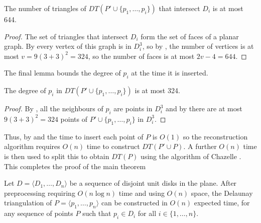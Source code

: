 \documentclass[lotsofwhite]{patmorin}
\begin{document}
\begin{lem}
The number of triangles of $DT(P'\cup\{p_1,\ldots,p_i\})$ that
intersect $D_i$ is at most 644.
\end{lem}

\begin{proof}
The set of triangles that intersect $D_i$ form the set of faces of a
planar graph.  By  every vertex of this graph is in
$D_i^3$, so by , the number of vertices 
is at most $v=9(3+3)^2=324$, so the number of faces is at most
$2v-4=644$. 
\end{proof}

The final lemma bounds the degree of $p_i$ at the time it is inserted.

\begin{lem}
The degree of $p_i$ in $DT(P'\cup\{p_1,\ldots,p_i\})$ is at most 324.
\end{lem}

\begin{proof}
By , all the neighbours of $p_i$ are points in $D_i^3$
and by  there are at most $9(3+3)^2=324$ points
of $P'\cup\{p_1,\ldots,p_i\}$ in $D_i^3$.
\end{proof}

Thus, by  and  the time to insert
each point of $P$ is $O(1)$ so the reconstruction algorithm requires
$O(n)$ time to construct $DT(P'\cup P)$.  A further $O(n)$ time is
then used to split this to obtain $DT(P)$ using the algorithm of
Chazelle \etal.  This completes the proof of the main theorem

\begin{thm}
Let $D=\langle D_1,\ldots,D_n\rangle$ be a sequence of disjoint unit
disks in the plane.  After preprocessing requiring $O(n\log n)$ time
and using $O(n)$ space, the Delaunay triangulation of $P=\langle
p_1,\ldots,p_n\rangle$ can be constructed in $O(n)$ expected time, for any
sequence of points $P$ such that $p_i\in D_i$ for all
$i\in\{1,\ldots,n\}$.
\end{thm}



\end{document}

